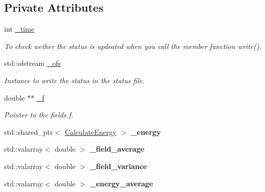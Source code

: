 \subsection*{Private Attributes}
\begin{DoxyCompactItemize}
\item 
\mbox{\label{class_status_a33dc61329a92fd5771e121fe411004ab}} 
int \mbox{\hyperlink{class_status_a33dc61329a92fd5771e121fe411004ab}{\+\_\+time}}
\begin{DoxyCompactList}\small\item\em To check wether the status is updeated when you call the member function \textquotesingle{}write()\textquotesingle{}. \end{DoxyCompactList}\item 
\mbox{\label{class_status_a4f4a73ea4d39218be9357f850d0da0bf}} 
std\+::ofstream \mbox{\hyperlink{class_status_a4f4a73ea4d39218be9357f850d0da0bf}{\+\_\+ofs}}
\begin{DoxyCompactList}\small\item\em Instance to write the status in the status file. \end{DoxyCompactList}\item 
\mbox{\label{class_status_a1c37348ecb8a8c83699b78a801131aac}} 
double $\ast$$\ast$ \mbox{\hyperlink{class_status_a1c37348ecb8a8c83699b78a801131aac}{\+\_\+f}}
\begin{DoxyCompactList}\small\item\em Pointer to the fields f. \end{DoxyCompactList}\item 
\mbox{\label{class_status_aa836aff401b3feb9246f390f2ed12761}} 
std\+::shared\+\_\+ptr$<$ \mbox{\hyperlink{class_calculate_energy}{Calculate\+Energy}} $>$ {\bfseries \+\_\+energy}
\item 
\mbox{\label{class_status_aed39d6b3166423fd6fb034213ae155e1}} 
std\+::valarray$<$ double $>$ {\bfseries \+\_\+field\+\_\+average}
\item 
\mbox{\label{class_status_a872aa7141f3a81006989e0d58a6b0ce4}} 
std\+::valarray$<$ double $>$ {\bfseries \+\_\+field\+\_\+variance}
\item 
\mbox{\label{class_status_a0ba31edaecd8eda04ba8e6dea5126459}} 
std\+::valarray$<$ double $>$ {\bfseries \+\_\+energy\+\_\+average}
\end{DoxyCompactItemize}


